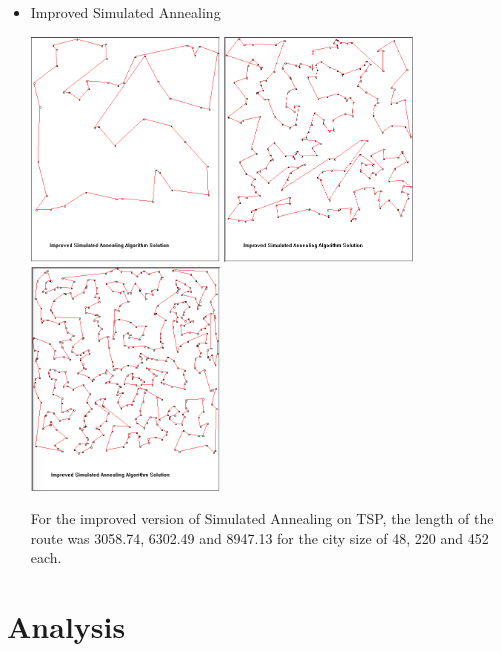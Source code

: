 \documentclass[12pt]{article}
\begin{document}
\begin{itemize}
\item Improved Simulated Annealing
		\begin{center}
			\includegraphics[width=5cm]{ImprovedSimulated48.PNG}
            \includegraphics[width=5cm]{ImprovedSimulated220.PNG}
            \includegraphics[width=5cm]{ImprovedSimulated452.png}
		\end{center}        

For the improved version of Simulated Annealing on TSP, the length of the route was 3058.74, 6302.49 and 8947.13 for the city size of 48, 220 and 452 each.

\end{itemize}

\section{Analysis}
\end{document}
